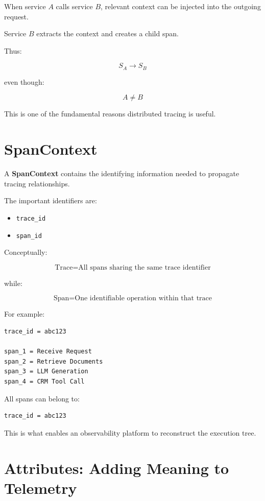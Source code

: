 \documentclass[11pt,a4paper]{article}
\begin{document}
When service $A$ calls service $B$, relevant context can be injected into the outgoing request.

Service $B$ extracts the context and creates a child span.

Thus:

\[
S_A
\rightarrow
S_B
\]

even though:

\[
A \neq B
\]

This is one of the fundamental reasons distributed tracing is useful.

\section{SpanContext}

A \textbf{SpanContext} contains the identifying information needed to propagate tracing relationships.

The important identifiers are:

\begin{itemize}
\item \texttt{trace\_id}
\item \texttt{span\_id}
\end{itemize}

Conceptually:

\[
\text{Trace} = \text{All spans sharing the same trace identifier}
\]

while:

\[
\text{Span} = \text{One identifiable operation within that trace}
\]

For example:

\begin{lstlisting}
trace_id = abc123

span_1 = Receive Request
span_2 = Retrieve Documents
span_3 = LLM Generation
span_4 = CRM Tool Call
\end{lstlisting}

All spans can belong to:

\begin{lstlisting}
trace_id = abc123
\end{lstlisting}

This is what enables an observability platform to reconstruct the execution tree.

\section{Attributes: Adding Meaning to Telemetry}
\end{document}
